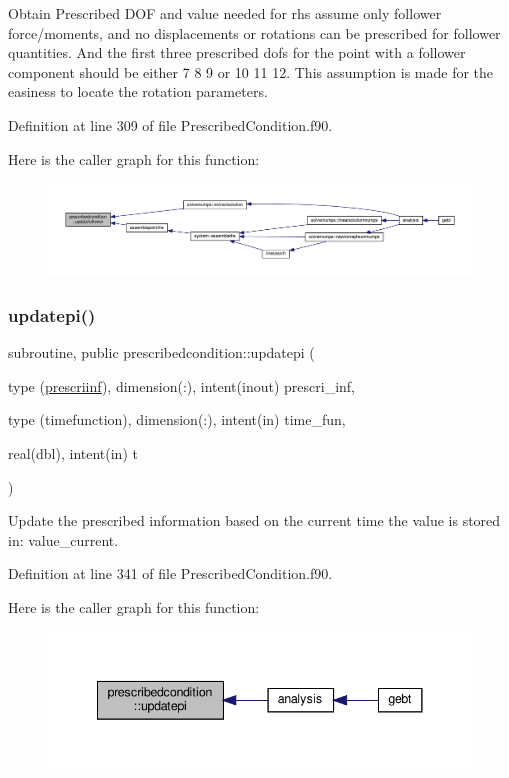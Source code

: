 Obtain Prescribed D\+OF and value needed for rhs assume only follower force/moments, and no displacements or rotations can be prescribed for follower quantities. And the first three prescribed dofs for the point with a follower component should be either 7 8 9 or 10 11 12. This assumption is made for the easiness to locate the rotation parameters. 



Definition at line 309 of file Prescribed\+Condition.\+f90.

Here is the caller graph for this function\+:\nopagebreak
\begin{figure}[H]
\begin{center}
\leavevmode
\includegraphics[width=350pt]{namespaceprescribedcondition_a58a4332d8bb0ceb882aa3229085dce34_icgraph}
\end{center}
\end{figure}
\mbox{\label{namespaceprescribedcondition_a270714d4f42553a8f966674392dedbfe}} 
\subsubsection{\texorpdfstring{updatepi()}{updatepi()}}
{\footnotesize\ttfamily subroutine, public prescribedcondition\+::updatepi (\begin{DoxyParamCaption}\item[{type (\hyperlink{structprescribedcondition_1_1prescriinf}{prescriinf}), dimension(\+:), intent(inout)}]{prescri\+\_\+inf,  }\item[{type (timefunction), dimension(\+:), intent(in)}]{time\+\_\+fun,  }\item[{real(dbl), intent(in)}]{t }\end{DoxyParamCaption})}



Update the prescribed information based on the current time the value is stored in\+: value\+\_\+current. 



Definition at line 341 of file Prescribed\+Condition.\+f90.

Here is the caller graph for this function\+:\nopagebreak
\begin{figure}[H]
\begin{center}
\leavevmode
\includegraphics[width=341pt]{namespaceprescribedcondition_a270714d4f42553a8f966674392dedbfe_icgraph}
\end{center}
\end{figure}
